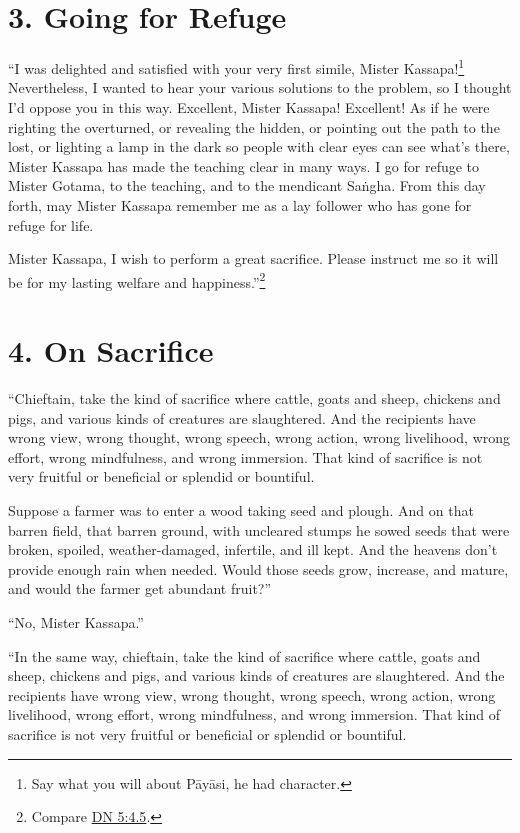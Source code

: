 \documentclass[12pt,openany]{book}%
\begin{document}
\section*{3. Going for Refuge }

“I was delighted and satisfied with your very first simile, Mister Kassapa!\footnote{Say what you will about \textsanskrit{Pāyāsi}, he had character. } Nevertheless, I wanted to hear your various solutions to the problem, so I thought I’d oppose you in this way. Excellent, Mister Kassapa! Excellent! As if he were righting the overturned, or revealing the hidden, or pointing out the path to the lost, or lighting a lamp in the dark so people with clear eyes can see what’s there, Mister Kassapa has made the teaching clear in many ways. I go for refuge to Mister Gotama, to the teaching, and to the mendicant \textsanskrit{Saṅgha}. From this day forth, may Mister Kassapa remember me as a lay follower who has gone for refuge for life. 

Mister Kassapa, I wish to perform a great sacrifice. Please instruct me so it will be for my lasting welfare and happiness.”\footnote{Compare \href{https://suttacentral.net/dn5/en/sujato\#4.5}{DN 5:4.5}. } 

\section*{4. On Sacrifice }

“Chieftain, take the kind of sacrifice where cattle, goats and sheep, chickens and pigs, and various kinds of creatures are slaughtered. And the recipients have wrong view, wrong thought, wrong speech, wrong action, wrong livelihood, wrong effort, wrong mindfulness, and wrong immersion. That kind of sacrifice is not very fruitful or beneficial or splendid or bountiful. 

Suppose a farmer was to enter a wood taking seed and plough. And on that barren field, that barren ground, with uncleared stumps he sowed seeds that were broken, spoiled, weather-damaged, infertile, and ill kept. And the heavens don’t provide enough rain when needed. Would those seeds grow, increase, and mature, and would the farmer get abundant fruit?” 

“No, Mister Kassapa.” 

“In the same way, chieftain, take the kind of sacrifice where cattle, goats and sheep, chickens and pigs, and various kinds of creatures are slaughtered. And the recipients have wrong view, wrong thought, wrong speech, wrong action, wrong livelihood, wrong effort, wrong mindfulness, and wrong immersion. That kind of sacrifice is not very fruitful or beneficial or splendid or bountiful. 
\end{document}
